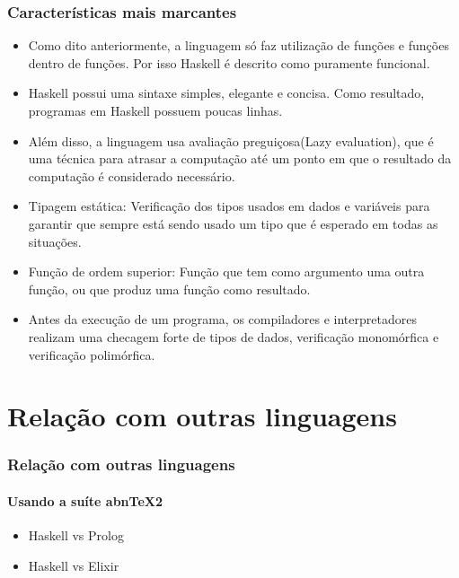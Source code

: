 \documentclass[aspectratio=169]{beamer}
\begin{document}
    \begin{frame}
      \frametitle{Características mais marcantes}

      \begin{itemize}
        \item Como dito anteriormente, a linguagem só faz utilização de funções e funções dentro de funções. Por isso
        Haskell é descrito como puramente funcional. 
        \item Haskell possui uma sintaxe simples, elegante e concisa. Como resultado, programas em Haskell possuem 
        poucas linhas. 
        \item Além disso, a linguagem usa avaliação preguiçosa(Lazy evaluation), que é uma técnica para atrasar a computação 
        até um ponto em que o resultado da computação é considerado necessário.
        \item Tipagem estática: Verificação dos tipos usados em dados e variáveis para 
        garantir que sempre está sendo usado um tipo que é esperado em todas as situações. 
        \item Função de ordem superior: Função que tem como argumento uma outra função, ou que produz 
        uma função como resultado.
        \item Antes da execução de um programa, os compiladores e interpretadores realizam uma checagem forte de tipos
        de dados, verificação monomórfica e verificação polimórfica.
      \end{itemize}

    \end{frame}


    \section{Relação com outras linguagens}

    \begin{frame}
      \frametitle{Relação com outras linguagens}
      \framesubtitle{Usando a suíte abnTeX2}

      \begin{itemize}
        \item Haskell vs Prolog
        \item Haskell vs Elixir
      \end{itemize}

    \end{frame}
\end{document}

